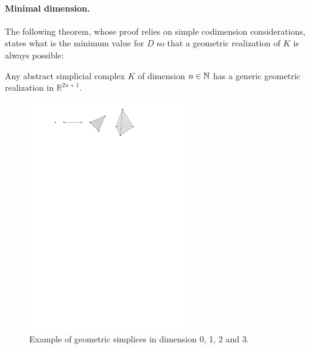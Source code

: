 \paragraph*{Minimal dimension.} The following theorem, 
whose proof relies on simple codimension considerations, 
states what is the minimum value for $D$ so that a geometric 
realization of $K$ is always possible:

\begin{thm} 
Any abstract simplicial complex $K$ of dimension $n\in\mathbb{N}$ has a generic geometric realization in $\mathbb{R}^{2n+1}$. 
\end{thm}



\begin{figure}[h]\centering 
\includegraphics[width = 7cm]{figures/Simplices} 
\caption[Geometric simplices]{
Example of geometric simplices in dimension 0, 1, 2 and 3.} 
\label{fig:geomsimpl} 
\end{figure}
 

